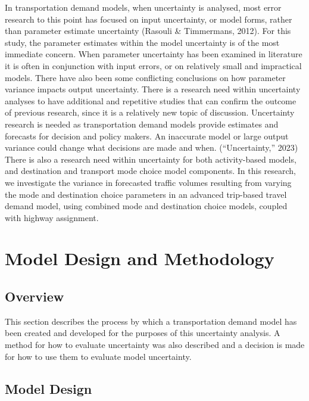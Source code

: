 \documentclass[fancy, masters,twoside]{byuthesis}
\begin{document}
In transportation demand models, when uncertainty is analysed, most error research to this point has focused on input uncertainty, or model forms, rather than parameter estimate uncertainty (Rasouli \& Timmermans, 2012). For this study, the parameter estimates within the model uncertainty is of the most immediate concern. When parameter uncertainty has been examined in literature it is often in conjunction with input errors, or on relatively small and impractical models. There have also been some conflicting conclusions on how parameter variance impacts output uncertainty. There is a research need within uncertainty analyses to have additional and repetitive studies that can confirm the outcome of previous research, since it is a relatively new topic of discussion. Uncertainty research is needed as transportation demand models provide estimates and forecasts for decision and policy makers. An inaccurate model or large output variance could change what decisions are made and when. ({``Uncertainty,''} 2023) There is also a research need within uncertainty for both activity-based models, and destination and transport mode choice model components. In this research, we investigate the variance in forecasted traffic volumes resulting from varying the mode and destination choice parameters in an advanced trip-based travel demand model, using combined mode and destination choice models, coupled with highway assignment.

\hypertarget{model-design-and-methodology}{%
\chapter{Model Design and Methodology}\label{model-design-and-methodology}}

\hypertarget{overview}{%
\section{Overview}\label{overview}}

This section describes the process by which a transportation demand model has been created and developed for the purposes of this uncertainty analysis. A method for how to evaluate uncertainty was also described and a decision is made for how to use them to evaluate model uncertainty.

\hypertarget{model-design}{%
\section{Model Design}\label{model-design}}
\end{document}
